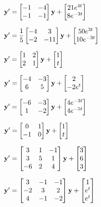 \begin{exerciselistTwoColumn}

\item\label{exer:10.7.1}$\mathbf{y}'=\begin{bmatrix}-1&-4\\-1&-1\end{bmatrix}\mathbf{y}+\begin{bmatrix}21e^{4t}\\8e^{-3t}\end{bmatrix}$

\item\label{exer:10.7.2}$\mathbf{y}'
=\dfrac{1}{5}\begin{bmatrix}-4&3\\-2&-11\end{bmatrix}\mathbf{y}
+\begin{bmatrix}50e^{3t}\\10e^{-3t}\end{bmatrix}$

\item\label{exer:10.7.3}$\mathbf{y}'=\begin{bmatrix}1&2\\2&1\end{bmatrix}\mathbf{y}+\begin{bmatrix}1\\t\end{bmatrix}$

\item\label{exer:10.7.4}$\mathbf{y}'=\begin{bmatrix}-4&-3\\6&5\end{bmatrix}\mathbf{y}+\begin{bmatrix}2\\-2e^t\end{bmatrix}$

\item\label{exer:10.7.5}$\mathbf{y}'=\begin{bmatrix}-6&-3\\1&-2\end{bmatrix}\mathbf{y}+\begin{bmatrix}4e^{-3t}\\4e^{-5t}\end{bmatrix}$

\item\label{exer:10.7.6}$\mathbf{y}'=\begin{bmatrix}0&1\\-1&0\end{bmatrix}\mathbf{y}+\begin{bmatrix}1\\t\end{bmatrix}$

\item\label{exer:10.7.7}$\mathbf{y}'=\begin{bmatrix}3&1&-1\\3&5&1\\-6&2&4\end{bmatrix}\mathbf{y}+\begin{bmatrix}3\\6\\3\end{bmatrix}$

\item\label{exer:10.7.8}$\mathbf{y}'
=\begin{bmatrix}3&-1&-1\\-2&3&2\\4&-1&-2\end{bmatrix}\mathbf{y}
+\begin{bmatrix}1\\e^t\\e^t\end{bmatrix}$


\end{exerciselistTwoColumn}
